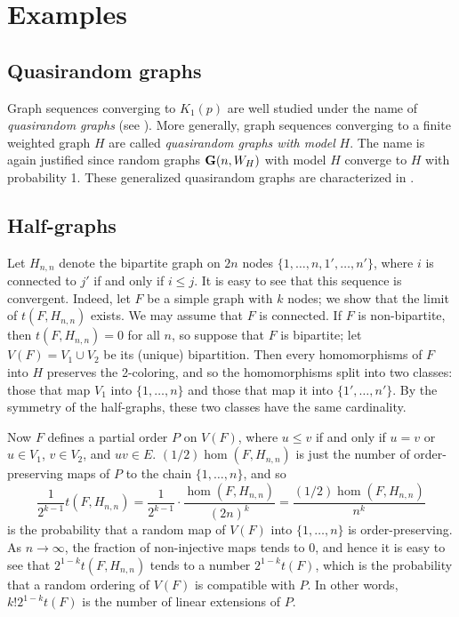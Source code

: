 \documentclass[fleqn]{article}
\begin{document}
\section{Examples}

\subsection{Quasirandom graphs}\label{RANDOM}

Graph sequences converging to $K_1(p)$ are well studied under the
name of {\it quasirandom graphs} (see \cite{CGW}). More generally,
graph sequences converging to a finite weighted graph $H$ are called
{\it quasirandom graphs with model} $H$. The name is again justified
since random graphs ${\mathbf G}(n,W_H)$ with model $H$ converge to $H$ with
probability 1. These generalized quasirandom graphs are characterized
in \cite{LS}.

\subsection{Half-graphs}\label{HALF}

Let $H_{n,n}$ denote the bipartite graph on $2n$ nodes
$\{1,\dots,n,1',\dots,n'\}$, where $i$ is connected to $j'$ if and
only if $i\le j$. It is easy to see that this sequence is convergent.
Indeed, let $F$ be a simple graph with $k$ nodes; we show that the
limit of $t(F,H_{n,n})$ exists. We may assume that $F$ is connected.
If $F$ is non-bipartite, then $t(F,H_{n,n})=0$ for all $n$, so
suppose that $F$ is bipartite; let $V(F)=V_1\cup V_2$ be its (unique)
bipartition. Then every homomorphisms of $F$ into $H$ preserves the
2-coloring, and so the homomorphisms split into two classes: those
that map $V_1$ into $\{1,\dots,n\}$ and those that map it into
$\{1',\dots,n'\}$. By the symmetry of the half-graphs, these two
classes have the same cardinality.

Now $F$ defines a partial order $P$ on $V(F)$, where $u\le v$ if and
only if $u=v$ or $u\in V_1$, $v\in V_2$, and $uv\in E$.
$(1/2)\hom(F,H_{n,n})$ is just the number of order-preserving maps of
$P$ to the chain $\{1,\dots,n\}$, and so
\[
\frac{1}{2^{k-1}} t(F,H_{n,n}) = \frac{1}{2^{k-1}} \cdot
\frac{\hom(F,H_{n,n})}{(2n)^k}=\frac{(1/2)\hom(F,H_{n,n})}{n^k}
\]
is the probability that a random map of $V(F)$ into $\{1,\dots,n\}$
is order-preserving. As $n\to\infty$, the fraction of non-injective
maps tends to $0$, and hence it is easy to see that
$2^{1-k}t(F,H_{n,n})$ tends to a number $2^{1-k}t(F)$, which is the
probability that a random ordering of $V(F)$ is compatible with $P$.
In other words, $k!2^{1-k}t(F)$ is the number of linear extensions of
$P$.
\end{document}
